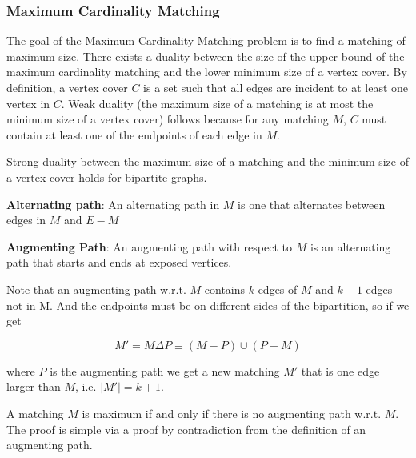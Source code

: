 \documentclass[../notes.tex]{subfiles}
\begin{document}
\subsubsection{Maximum Cardinality Matching}
The goal of the Maximum Cardinality Matching problem is to find a matching of maximum size.
There exists a duality between the size of the upper bound of the maximum cardinality matching and the lower minimum size of a vertex cover.
By definition, a vertex cover $ C $ is a set such that all edges are incident to at least one vertex in $ C $. 
Weak duality (the maximum size of a matching is at most the minimum size of a vertex cover) follows because for any matching $ M $, $ C $ must contain at least one of the endpoints of each edge in $ M $.

\begin{theorem}
    Strong duality between the maximum size of a matching and the minimum size of a vertex cover holds for bipartite graphs.
\end{theorem}

\begin{definition}
    \textbf{Alternating path}: An alternating path in $ M $ is one that alternates between edges in $ M $ and $ E-M $
\end{definition}

\begin{definition}
    \textbf{Augmenting Path}: An augmenting path with respect to $ M $ is an alternating path that starts and ends at exposed vertices.
\end{definition}

Note that an augmenting path w.r.t. $ M $ contains $ k $ edges of $ M $ and $ k+1 $ edges not in M. And the endpoints must be on different sides of the bipartition, so if we get

\begin{equation}
    M' = M \Delta P \equiv (M-P) \cup (P-M)
\end{equation}

where $ P $ is the augmenting path we get a new matching $ M' $ that is one edge larger than $ M $, i.e. $ |M'| = k + 1 $.

\begin{theorem}
    A matching $ M $ is maximum if and only if there is no augmenting path w.r.t. $ M $.
    The proof is simple via a proof by contradiction from the definition of an augmenting path.
\end{theorem}
\end{document}
